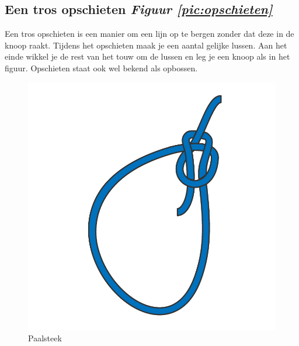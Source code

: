\subsection{Een tros opschieten \hfill \textit{Figuur \ref{pic:opschieten}}}
Een tros opschieten is een manier om een lijn op te bergen zonder dat deze in de knoop raakt. Tijdens het opschieten maak je een aantal gelijke lussen. Aan het einde wikkel je de rest van het touw om de lussen en leg je een knoop als in het figuur. Opschieten staat ook wel bekend als opbossen.
\begin{figure}[h]
  \centering
  \begin{minipage}[b]{0.32\textwidth}
  \centering
    \includegraphics[width=\textwidth]{Hoofdstukken/Schiemannen/pdf/paalsteek.pdf}
    \caption{Paalsteek}
    \label{pic:paal_steek}
  \end{minipage}
  \hfill
  \begin{minipage}[b]{0.32\textwidth}
    \centering

\end{minipage}
\end{figure}
